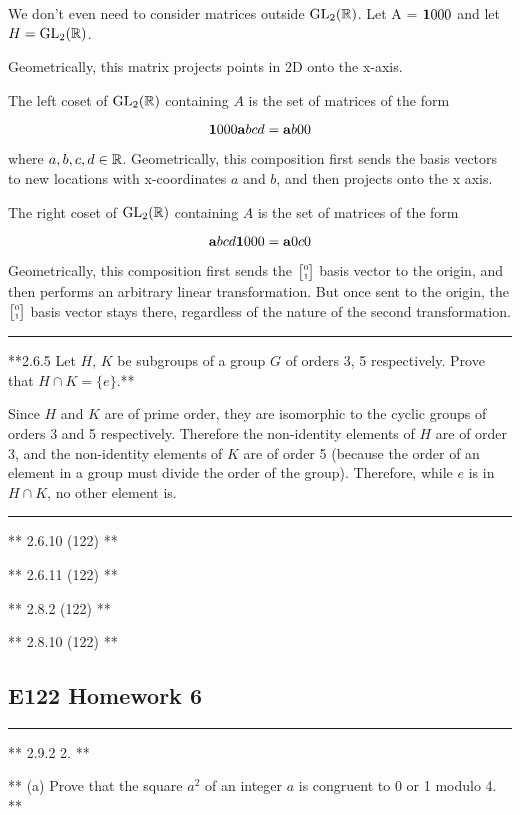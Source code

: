 We don't even need to consider matrices outside $\mathrm{GL}_2(\mathbb{R})$. Let A =
$\tiny{\mathbf{1}{0}{0}{0}}$ and let $H = \mathrm{GL}_2(\mathbb{R})$.

Geometrically, this matrix projects points in 2D onto the x-axis.

The left coset of $\mathrm{GL}_2(\mathbb{R})$ containing $A$ is the set of matrices of the form

$$
\tiny{\mathbf{1}{0}{0}{0}} \tiny{\mathbf{a}{b}{c}{d}} = \tiny{\mathbf{a}{b}{0}{0}}
$$

where $a,b,c,d \in \mathbb{R}$. Geometrically, this composition first sends the basis
vectors to new locations with x-coordinates $a$ and $b$, and then projects onto
the x axis.

The right coset of $\mathrm{GL}_2(\mathbb{R})$ containing $A$ is the set of matrices of the form

$$
\tiny{\mathbf{a}{b}{c}{d}} \tiny{\mathbf{1}{0}{0}{0}} = \tiny{\mathbf{a}{0}{c}{0}}
$$

Geometrically, this composition first sends the $\tiny{\begin{bmatrix}0\\1\end{bmatrix}}$ basis vector to
the origin, and then performs an arbitrary linear transformation. But once sent
to the origin, the $\tiny{\begin{bmatrix}0\\1\end{bmatrix}}$ basis vector stays there, regardless of the
nature of the second transformation.

\hrule

**2.6.5 Let $H$, $K$ be subgroups of a group $G$ of orders 3, 5
  respectively. Prove that $H \cap K = \{e\}$.**

Since $H$ and $K$ are of prime order, they are isomorphic to the cyclic groups
of orders 3 and 5 respectively. Therefore the non-identity elements of $H$ are
of order 3, and the non-identity elements of $K$ are of order 5 (because the
order of an element in a group must divide the order of the group). Therefore,
while $e$ is in $H \cap K$, no other element is.

\hrule


** 2.6.10 (122) **

** 2.6.11 (122) **

** 2.8.2 (122) **

** 2.8.10 (122) **


\subsection{E122 Homework 6}

\hrule
** 2.9.2 2. **

** (a) Prove that the square $a^2$ of an integer $a$ is congruent to 0 or 1 modulo 4. **

